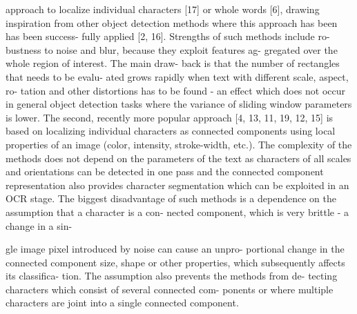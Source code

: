 approach to localize individual characters [17] or whole
words [6], drawing inspiration from other object detection
methods where this approach has been has been success-
fully applied [2, 16]. Strengths of such methods include ro-
bustness to noise and blur, because they exploit features ag-
gregated over the whole region of interest. The main draw-
back is that the number of rectangles that needs to be evalu-
ated grows rapidly when text with different scale, aspect, ro-
tation and other distortions has to be found - an effect which
does not occur in general object detection tasks where the
variance of sliding window parameters is lower.
The second, recently more popular approach [4, 13, 11,
19, 12, 15] is based on localizing individual characters as
connected components using local properties of an image
(color, intensity, stroke-width, etc.). The complexity of the
methods does not depend on the parameters of the text as
characters of all scales and orientations can be detected in
one pass and the connected component representation also
provides character segmentation which can be exploited in
an OCR stage. The biggest disadvantage of such methods
is a dependence on the assumption that a character is a con-
nected component, which is very brittle - a change in a sin-

gle image pixel introduced by noise can cause an unpro-
portional change in the connected component size, shape or
other properties, which subsequently affects its classifica-
tion. The assumption also prevents the methods from de-
tecting characters which consist of several connected com-
ponents or where multiple characters are joint into a single
connected component.

